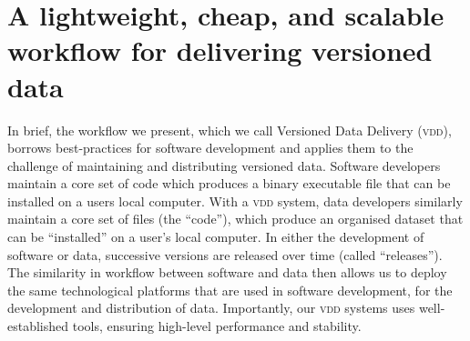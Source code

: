 \documentclass[a4paper,11pt]{article}
\begin{document}



\section{A lightweight, cheap, and scalable workflow for delivering versioned data}


In brief, the workflow we present, which we call Versioned Data Delivery (\textsc{vdd}), borrows best-practices for software development \cite{Perez-Riverol-2016} and applies them to the challenge of maintaining and distributing versioned data. Software developers maintain a core set of code which produces a binary executable file that can be installed on a users local computer. With a \textsc{vdd} system, data developers similarly maintain a core set of files (the ``code''), which produce an organised dataset that can be ``installed'' on a user's local computer. In either the development of software or data, successive versions are released over time (called ``releases''). The similarity in workflow between software and data then allows us to deploy the same technological platforms that are used in software development, for the development and distribution of data. Importantly, our \textsc{vdd} systems uses well-established tools, ensuring high-level performance and stability.
\end{document}
